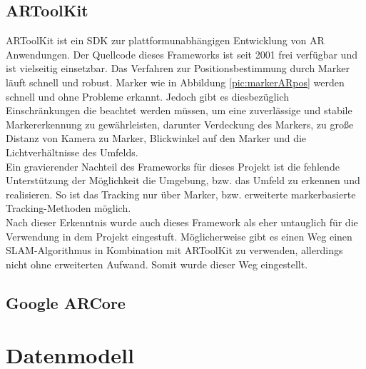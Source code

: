 \subsection{ARToolKit}
ARToolKit ist ein \acs{SDK} zur plattformunabhängigen Entwicklung von \acl{AR} Anwendungen. Der Quellcode dieses Frameworks ist seit 2001 
frei verfügbar und ist vielseitig einsetzbar. Das Verfahren zur Positionsbestimmung durch Marker läuft schnell und robust. Marker wie in 
Abbildung \ref{pic:markerARpos} werden schnell und ohne Probleme erkannt. Jedoch gibt es diesbezüglich Einschränkungen die beachtet werden 
müssen, um eine zuverlässige und stabile Markererkennung zu gewährleisten, darunter Verdeckung des Markers, zu große Distanz von Kamera 
zu Marker, Blickwinkel auf den Marker und die Lichtverhältnisse des Umfelds. 
\\ 
Ein gravierender Nachteil des Frameworks für dieses Projekt ist die fehlende Unterstützung der Möglichkeit die 
Umgebung, bzw. das Umfeld zu erkennen und realisieren. So ist das Tracking nur über Marker, bzw. erweiterte 
markerbasierte Tracking-Methoden möglich. 
\\ 
Nach dieser Erkenntnis wurde auch dieses Framework als eher untauglich für die Verwendung in dem Projekt eingestuft. Möglicherweise 
gibt es einen Weg einen \acs{SLAM}-Algorithmus in Kombination mit ARToolKit zu verwenden, allerdings nicht ohne erweiterten Aufwand. 
Somit wurde dieser Weg eingestellt. 
\subsection{Google ARCore}

\section{Datenmodell}
\label{chap:Datenmodell}